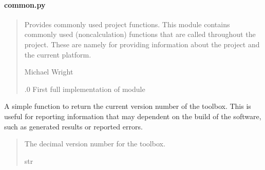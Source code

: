 \documentclass[letterpaper,10pt,english]{sphinxmanual}
\begin{document}
\paragraph{common.py}
\label{\detokenize{modules/util/system:common-py}}\begin{quote}\begin{description}
\sphinxAtStartPar
Provides commonly used project functions.
This module contains commonly used (non\sphinxhyphen{}calculation) functions that are
called throughout the project. These are namely for providing information
about the project and the current platform.

\sphinxAtStartPar
Michael Wright \sphinxhyphen{} 

.0 \sphinxhyphen{} First full implementation of module

\end{description}\end{quote}

\begin{fulllineitems}
\label{\detokenize{modules/util/system:qnav.util.system.get_toolbox_version}}
\pysigstartsignatures
{}
\pysigstopsignatures
\sphinxAtStartPar
A simple function to return the current version number of the toolbox.
This is useful for reporting information that may dependent on the build
of the software, such as generated results or reported errors.
\begin{quote}\begin{description}
\sphinxAtStartPar
The decimal version number for the toolbox.

\sphinxAtStartPar
str

\end{description}\end{quote}

\end{fulllineitems}

\end{document}
